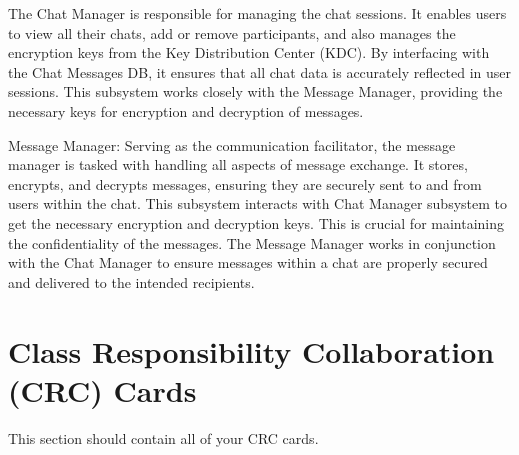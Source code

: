 \documentclass[]{article}
\begin{document}
    The Chat Manager is responsible for managing the chat sessions. It enables users to view all their chats, add or remove participants, and also manages the encryption keys from the Key Distribution Center (KDC). By interfacing with the Chat Messages DB, it ensures that all chat data is accurately reflected in user sessions. This subsystem works closely with the Message Manager, providing the necessary keys for encryption and decryption of messages.

    Message Manager: Serving as the communication facilitator, the message manager is tasked with handling all aspects of message exchange. It stores, encrypts, and decrypts messages, ensuring they are securely sent to and from users within the chat. This subsystem interacts with Chat Manager subsystem to get the necessary encryption and decryption keys. This is crucial for maintaining the confidentiality of the messages. The Message Manager works in conjunction with the Chat Manager to ensure messages within a chat are properly secured and delivered to the intended recipients.


	
\section{Class Responsibility Collaboration (CRC) Cards}
\label{sec:class_responsibility_collaboration_crc_cards}
This section should contain all of your CRC cards.
\end{document}
